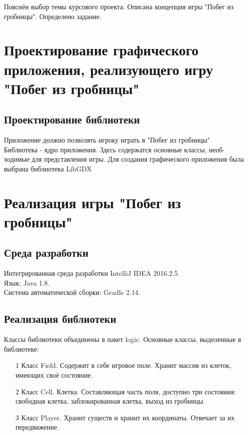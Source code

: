 Пояснён выбор темы курсового проекта. Описана концепция игры "Побег из гробницы". Определено задание.


\section{Проектирование графического приложения, реализующего игру "Побег из гробницы"}

\subsection{Проектирование библиотеки}

Приложение должно позволять игроку играть в "Побег из гробницы"\\

Библиотека - ядро приложения. Здесь содержатся основные классы, необ-
ходимые для представления игры. Для создания графического приложения
была выбрана библиотека LibGDX

\section{Реализация игры "Побег из гробницы"}

\subsection{Среда разработки}

Интегрированная среда разработки IntelliJ IDEA 2016.2.5.\\
Язык: Java 1.8.\\
Система автоматической сборки: Gradle 2.14.

\subsection{Реализация библиотеки}

Классы библиотеки объединены в пакет logic. Основные классы,
выделенные в библиотеке:\\

\begin{enumerate}
\item[1]  Класс Field. Содержит в себе игровое поле. Хранит массив из клеток, имеющих своё состояние.
\item[2]  Класс Cell. Клетка. Составляющая часть поля, доступно три состояния: свободная клетка, заблокированная клетка, выход из гробницы.
\item[3]  Класс Player. Хранит существ и хранит их координаты. Отвечает за их передвижение. 
\end{enumerate}


